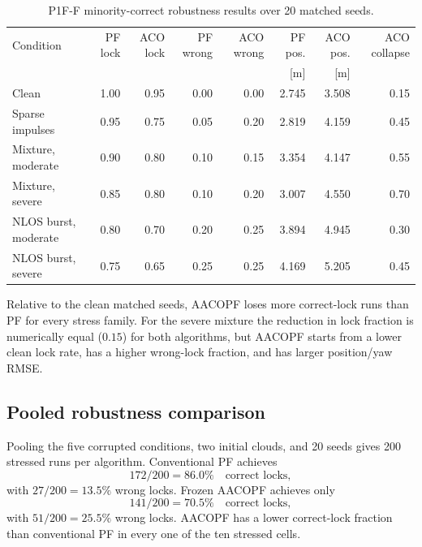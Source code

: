 \begin{table}[htbp]
    \centering
    \caption{P1F-F minority-correct robustness results over 20 matched seeds.}
    \label{tab:p1ff_minority}
    \begin{tabular}{lrrrrrrr}
        \toprule
        Condition & PF lock & ACO lock & PF wrong & ACO wrong & PF pos. & ACO pos. & ACO collapse\\
        & & & & & [m] & [m] & \\
        \midrule
        Clean                 & 1.00 & 0.95 & 0.00 & 0.00 & 2.745 & 3.508 & 0.15\\
        Sparse impulses       & 0.95 & 0.75 & 0.05 & 0.20 & 2.819 & 4.159 & 0.45\\
        Mixture, moderate     & 0.90 & 0.80 & 0.10 & 0.15 & 3.354 & 4.147 & 0.55\\
        Mixture, severe       & 0.85 & 0.80 & 0.10 & 0.20 & 3.007 & 4.550 & 0.70\\
        NLOS burst, moderate  & 0.80 & 0.70 & 0.20 & 0.25 & 3.894 & 4.945 & 0.30\\
        NLOS burst, severe    & 0.75 & 0.65 & 0.25 & 0.25 & 4.169 & 5.205 & 0.45\\
        \bottomrule
    \end{tabular}
\end{table}

Relative to the clean matched seeds, AACOPF loses more correct-lock runs than PF for every stress family. For the severe mixture the reduction in lock fraction is numerically equal ($0.15$) for both algorithms, but AACOPF starts from a lower clean lock rate, has a higher wrong-lock fraction, and has larger position/yaw RMSE.

\subsection{Pooled robustness comparison}
Pooling the five corrupted conditions, two initial clouds, and 20 seeds gives 200 stressed runs per algorithm. Conventional PF achieves
\begin{equation}
    172/200=86.0\% \quad \text{correct locks},
\end{equation}
with $27/200=13.5\%$ wrong locks. Frozen AACOPF achieves only
\begin{equation}
    141/200=70.5\% \quad \text{correct locks},
\end{equation}
with $51/200=25.5\%$ wrong locks. AACOPF has a lower correct-lock fraction than conventional PF in every one of the ten stressed cells.

